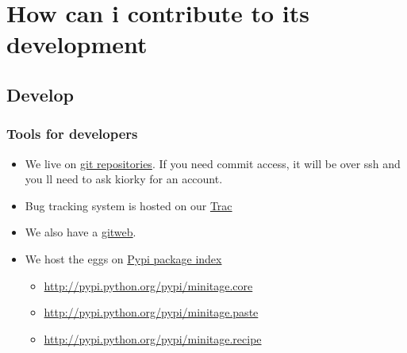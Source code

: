 \documentclass[letterpaper,10pt,english]{sphinxmanual}
\begin{document}
\chapter{How can i contribute to its development}
\label{index:how-can-i-contribute-to-its-development}

\section{Develop}
\label{develop:develop}\label{develop::doc}

\subsection{Tools for developers}
\label{develop:tools-for-developers}\begin{itemize}
\item {} 
We live on  \href{https://git.minitage.org}{git repositories}. If you need commit access, it will be over ssh and you ll need to ask kiorky for an account.

\item {} 
Bug tracking system is hosted on our \href{https://www.minitage.org/trac}{Trac}

\item {} 
We also have a \href{https://gitweb.minitage.org}{gitweb}.

\item {} 
We host the eggs on \href{http://pypi.python.org}{Pypi package index}
\begin{itemize}
\item {} 
\href{http://pypi.python.org/pypi/minitage.core}{http://pypi.python.org/pypi/minitage.core}

\item {} 
\href{http://pypi.python.org/pypi/minitage.paste}{http://pypi.python.org/pypi/minitage.paste}

\item {} 
\href{http://pypi.python.org/pypi/minitage.recipe}{http://pypi.python.org/pypi/minitage.recipe}

\end{itemize}

\end{itemize}
\end{document}
